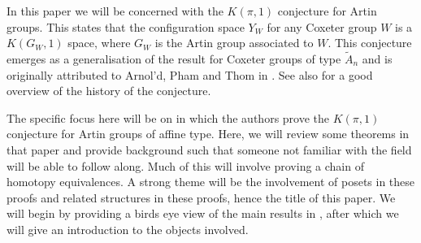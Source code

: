 \documentclass[class=article, crop=false]{standalone}
\begin{document}
In this paper we will be concerned with the $K(\pi,1)$ conjecture for Artin groups. This states that the configuration space $Y_W$ for any Coxeter group $W$ is a $K(G_W, 1)$ space, where $G_W$ is the Artin group associated to $W$. This conjecture emerges as a generalisation of the result for Coxeter groups of type $\tilde{A}_n$ and is originally attributed to Arnol'd, Pham and Thom in \cite{lek_homotopy_1983}. See also \cite{charney_k_1995} for a good overview of the history of the conjecture.

The specific focus here will be on \cite{paolini_salvetti_kpi1_2021} in which the authors prove the $K(\pi,1)$ conjecture for Artin groups of affine type. Here, we will review some theorems in that paper and provide background such that someone not familiar with the field will be able to follow along. Much of this will involve proving a chain of homotopy equivalences. A strong theme will be the involvement of posets in these proofs and related structures in these proofs, hence the title of this paper. We will begin by providing a birds eye view of the main results in \cite{paolini_salvetti_kpi1_2021}, after which we will give an introduction to the objects involved.
\end{document}
